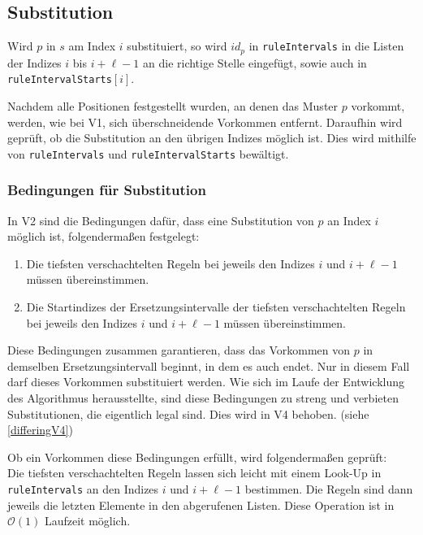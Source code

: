 \subsection{Substitution}
Wird $p$ in $s$ am Index $i$ substituiert, so wird $id_p$ in \texttt{ruleIntervals} in die Listen der Indizes $i$ bis $i + \ell - 1$ an die richtige Stelle eingefügt, sowie auch in \texttt{ruleIntervalStarts}$[i]$.

Nachdem alle Positionen festgestellt wurden, an denen das Muster $p$ vorkommt, werden, wie bei V1, sich überschneidende Vorkommen entfernt. Daraufhin wird geprüft, ob die Substitution an den übrigen Indizes möglich ist. Dies wird mithilfe von \texttt{ruleIntervals} und \texttt{ruleIntervalStarts} bewältigt.

\subsubsection{Bedingungen für Substitution}
\label{v2substitutionconditions}

In V2 sind die Bedingungen dafür, dass eine Substitution von $p$ an Index $i$ möglich ist, folgendermaßen festgelegt:

\begin{enumerate}
	\item Die tiefsten verschachtelten Regeln bei jeweils den Indizes $i$ und $i + \ell - 1$ müssen übereinstimmen.
	\item Die Startindizes der Ersetzungsintervalle der tiefsten verschachtelten Regeln bei jeweils den Indizes $i$ und $i + \ell - 1$ müssen übereinstimmen. 
\end{enumerate}

Diese Bedingungen zusammen garantieren, dass das Vorkommen von $p$ in demselben Ersetzungsintervall beginnt, in dem es auch endet. Nur in diesem Fall darf dieses Vorkommen substituiert werden. Wie sich im Laufe der Entwicklung des Algorithmus herausstellte, sind diese Bedingungen zu streng und verbieten Substitutionen, die eigentlich legal sind. Dies wird in V4 behoben. (siehe \autoref{differingV4})

Ob ein Vorkommen diese Bedingungen erfüllt, wird folgendermaßen geprüft:\\
Die tiefsten verschachtelten Regeln lassen sich leicht mit einem Look-Up in \texttt{ruleIntervals} an den Indizes $i$ und $i + \ell - 1$ bestimmen. Die Regeln sind dann jeweils die letzten Elemente in den abgerufenen Listen. Diese Operation ist in $\mathcal{O}(1)$ Laufzeit möglich.

